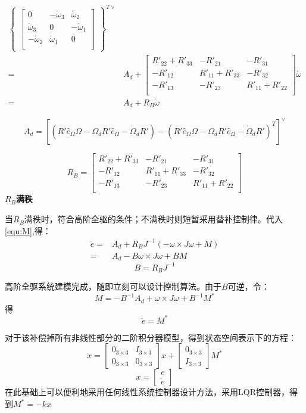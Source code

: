 $$\begin{aligned}
\begin{Bmatrix}
\begin{bmatrix}
        0 & -\dot\omega_3 &\dot\omega_2  \\
         \dot\omega_3& 0 &  -\dot\omega_1\\
         -\dot\omega_2&\dot\omega_1  & 0 \\
        \end{bmatrix}\end{Bmatrix}^{T\vee}\\
        =&A_d+\begin{bmatrix}
        R'_{22}+R'_{33} & -R'_{21} & -R'_{31} \\
         -R'_{12}& R'_{11}+R'_{33} & -R'_{32} \\
         -R'_{13}&- R'_{23} & R'_{11}+R'_{22} \\
        \end{bmatrix}\dot \omega\\
        =&A_d+R_B\dot \omega
        \end{aligned}  $$

        $$A_d=[(R' \hat e_\Omega \Omega  -\Omega_d R' \hat e_\Omega -\dot \Omega_d R')-(R' \hat e_\Omega \Omega  -\Omega_d R' \hat e_\Omega -\dot \Omega_d R')^T]^\vee$$

        $$R_B=\begin{bmatrix}
            R'_{22}+R'_{33} & -R'_{21} & -R'_{31} \\
             -R'_{12}& R'_{11}+R'_{33} & -R'_{32} \\
             -R'_{13}&- R'_{23} & R'_{11}+R'_{22} \\
            \end{bmatrix}$$
\textbf{$R_B$满秩}

    当$R_B$满秩时，符合高阶全驱的条件；不满秩时则短暂采用替补控制律。代入\ref{equ:M},得：
    $$\begin{aligned}
        \ddot e=&A_d+R_B J^{-1}(-\omega \times J\omega+M)\\
        =&A_d-B \omega\times J\omega +BM
        \end{aligned}$$
        $$B=R_BJ^{-1}$$

    高阶全驱系统建模完成，随即立刻可以设计控制算法。由于$B$可逆，令：
    $$M=-B^{-1} A_d+\omega \times J\omega +B^{-1}M^*$$
    得
    $$\ddot e=M^*$$

    对于该补偿掉所有非线性部分的二阶积分器模型，得到状态空间表示下的方程：
    $$\dot x=\begin{bmatrix}
        0_{3\times 3} & I_{3\times 3} \\
        0_{3\times 3} & 0_{3\times 3}
    \end{bmatrix} x+\begin{bmatrix}
        0_{3\times 3} \\ I_{3\times 3}
    \end{bmatrix} M^* $$
    $$x=\begin{bmatrix}
        e \\ \dot e
    \end{bmatrix}$$
    在此基础上可以便利地采用任何线性系统控制器设计方法，采用LQR控制器，得到$M^*=-kx$

